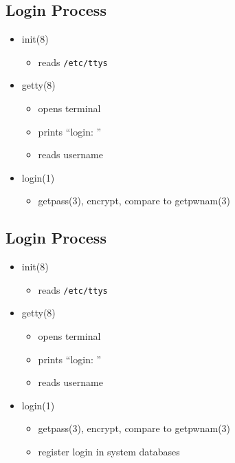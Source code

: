 \documentclass[xga]{xdvislides}
\begin{document}
\subsection{Login Process}
\begin{itemize}
	\item init(8)
		\begin{itemize}
			\item reads {\tt /etc/ttys}
		\end{itemize}
	\item getty(8)
		\begin{itemize}
			\item opens terminal
			\item prints ``login: ''
			\item reads username
		\end{itemize}
	\item login(1)
		\begin{itemize}
			\item getpass(3), encrypt, compare to getpwnam(3)
		\end{itemize}
\end{itemize}

\subsection{Login Process}
\begin{itemize}
	\item init(8)
		\begin{itemize}
			\item reads {\tt /etc/ttys}
		\end{itemize}
	\item getty(8)
		\begin{itemize}
			\item opens terminal
			\item prints ``login: ''
			\item reads username
		\end{itemize}
	\item login(1)
		\begin{itemize}
			\item getpass(3), encrypt, compare to getpwnam(3)
			\item register login in system databases
		\end{itemize}
\end{itemize}
\end{document}
